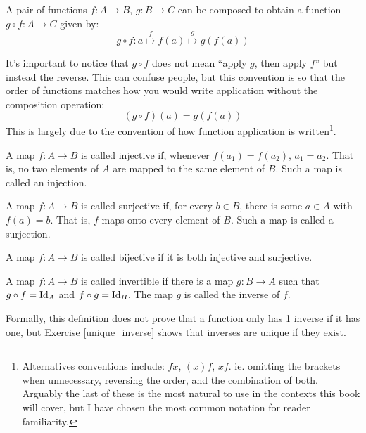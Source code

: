 \begin{definition}
    A pair of functions $f \colon A \to B$, $g \colon B \to C$ can be composed to obtain a function $g \circ f \colon A \to C$ given by:
    \begin{equation*}
        g \circ f \colon a \overset{f}{\longmapsto} f(a) \overset{g}{\longmapsto} g(f(a))
    \end{equation*}
\end{definition}
\begin{remark}
    It's important to notice that $g \circ f$ does not mean ``apply $g$, then apply $f$'' but instead the reverse.
    This can confuse people, but this convention is so that the order of functions matches how you would write application without the composition operation:
    \begin{equation*}
        (g \circ f)(a) = g(f(a))
    \end{equation*}
    This is largely due to the convention of how function application is written\footnote{Alternatives conventions include: $f x$, $(x)f$, $x f$. ie. omitting the brackets when unnecessary, reversing the order, and the combination of both. Arguably the last of these is the most natural to use in the contexts this book will cover, but I have chosen the most common notation for reader familiarity.}.
\end{remark}

\begin{definition}
    A map $f \colon A \to B$ is called injective if, whenever $f(a_1) = f(a_2)$, $a_1 = a_2$. That is, no two elements of $A$ are mapped to the same element of $B$. Such a map is called an injection.

    \medskip\noindent
    A map $f \colon A \to B$ is called surjective if, for every $b \in B$, there is some $a \in A$ with $f(a) = b$. That is, $f$ maps onto every element of $B$. Such a map is called a surjection.

    \medskip\noindent
    A map $f \colon A \to B$ is called bijective if it is both injective and surjective.
\end{definition}

\begin{definition}
    A map $f \colon A \to B$ is called invertible if there is a map $g \colon B \to A$ such that $g \circ f = \operatorname{Id}_A$ and $f \circ g = \operatorname{Id}_B$. The map $g$ is called the inverse of $f$.
\end{definition}
\begin{remark}
    Formally, this definition does not prove that a function only has 1 inverse if it has one, but Exercise \ref{unique_inverse} shows that inverses are unique if they exist.
\end{remark}


